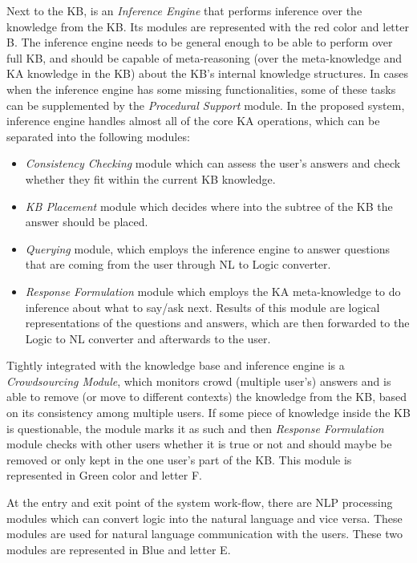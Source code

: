 Next to the KB, is an \emph{Inference Engine} that performs inference over 
the knowledge from the KB. Its modules are represented with the red color 
and letter B. The inference engine needs to be general enough to be able to
perform over full KB, and should be capable of meta-reasoning (over the 
meta-knowledge and KA knowledge in the KB) about the KB's internal knowledge
structures. In cases when the inference engine has some missing functionalities,
some of these tasks can be supplemented by the \emph{Procedural Support} 
module. In the proposed system, inference engine handles almost all of the 
core KA operations, which can be separated into the following modules:
\begin{itemize}
   \item \emph{Consistency Checking} module which can assess the user's answers
   and check whether they fit within the current KB knowledge.
   \item \emph{KB Placement} module which decides where into the subtree of the
   KB the answer should be placed.
   \item \emph{Querying} module, which employs the inference engine to answer
   questions that are coming from the user through NL to Logic converter.
   \item \emph{Response Formulation} module which employs the KA meta-knowledge
   to do inference about what to say/ask next. Results of this module are logical representations of the questions and answers, which are then
   forwarded to the Logic to NL converter and afterwards to the user.
\end{itemize}

Tightly integrated with the knowledge base and inference engine is a 
\emph{Crowdsourcing Module}, which monitors crowd (multiple user's) answers and 
is able to remove (or move to different contexts) the knowledge from the KB, 
based on its consistency among multiple users. If some piece of knowledge inside
the KB is questionable, the module marks it as such and then \emph{Response
Formulation} module checks with other users whether it is true or not and should
maybe be removed or only kept in the one user's part of the KB. This module is 
represented in Green color and letter F.

At the entry and exit point of the system work-flow, there are NLP processing  
modules which can convert logic into the natural language and vice versa. These
modules are used for natural language communication with the users. These two
modules are represented in Blue and letter E.

